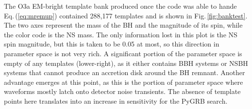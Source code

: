 \documentclass[binding=0.6cm, LaM]{sapthesis}
\begin{document}

	The O3a EM-bright template bank produced once the code was able to hande Eq.\,(\ref{eq:mremup}) contained 288,177 templates and is shown in Fig.\,\ref{fig:banktest}.  The two axes represent the mass of the BH and the magnitude of its spin, while the color code is the NS mass.  The only information lost in this plot is the NS spin magnitude, but this is taken to be 0.05 at most, so this direction in parameter space is not very rich.
        A significant portion of the parameter space is empty of any templates (lower-right),
        as it either contains BBH systems or NSBH systems that cannot produce an accretion disk around the BH remnant.
        Another advantage emerges at this point, as this is the portion of parameter space where waveforms mostly latch onto detector noise transients.  The absence of template points here translates into an increase in sensitivity for the {\rm PyGRB} search.
\end{document}
